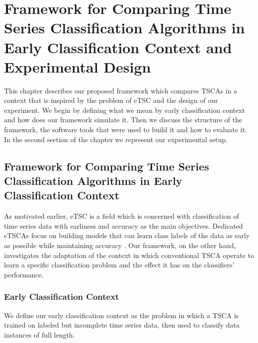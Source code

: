 \chapter{Framework for Comparing Time Series Classification Algorithms in Early Classification Context and Experimental Design}
\label{ChapterFrameworkExperiment}
This chapter describes our proposed framework which compares TSCAs in a context that is inspired by the problem of eTSC and the design of our experiment.
We begin by defining what we mean by early classification context and how does our framework simulate it.
Then we discuss the structure of the framework, the software tools that were used to build it and how to evaluate it.
In the second section of the chapter we represent our experimental setup.

%

\section{Framework for Comparing Time Series Classification Algorithms in Early Classification Context}
\label{SectionNewFramework}
As motivated earlier, eTSC is a field which is concerned with classification of time series data with earliness and accuracy
as the main objectives. Dedicated eTSCAs focus on building models that can learn class labels of the data as early as possible
while maintaining accuracy \cite{mori2017early}.
Our framework, on the other hand, investigates the adaptation of the context in which conventional TSCA operate to learn a specific
classification problem and the effect it has on the classifiers' performance. 

\subsection{Early Classification Context}
\label{SubsectionEarlyClassificationContext}
We define our early classification context as the problem in which a TSCA is trained on labeled but incomplete time series data, then
used to classify data instances of full length.

